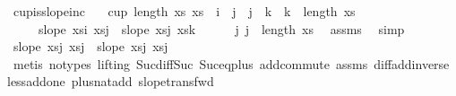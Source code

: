 \begin{isabellebody}
\isamarkupfalse%
\ cup{\isacharunderscore}{\kern0pt}is{\isacharunderscore}{\kern0pt}slopeinc{\isacharcolon}{\kern0pt}\isanewline
\ \ \ {\isachardoublequoteopen}cup\ {\isacharparenleft}{\kern0pt}length\ xs{\isacharparenright}{\kern0pt}\ xs{\isachardoublequoteclose}\ \ {\isachardoublequoteopen}i\ {\isacharless}{\kern0pt}\ j\ {\isasymand}\ j\ {\isacharless}{\kern0pt}\ k\ {\isasymand}\ k\ {\isacharless}{\kern0pt}\ length\ xs{\isachardoublequoteclose}\isanewline
\ \ \ \ \ {\isachardoublequoteopen}slope\ {\isacharparenleft}{\kern0pt}xs{\isacharbang}{\kern0pt}i{\isacharparenright}{\kern0pt}\ {\isacharparenleft}{\kern0pt}xs{\isacharbang}{\kern0pt}j{\isacharparenright}{\kern0pt}\ {\isacharless}{\kern0pt}\ slope\ {\isacharparenleft}{\kern0pt}xs{\isacharbang}{\kern0pt}j{\isacharparenright}{\kern0pt}\ {\isacharparenleft}{\kern0pt}xs{\isacharbang}{\kern0pt}k{\isacharparenright}{\kern0pt}{\isachardoublequoteclose}\isanewline
%
\isadelimproof
%
\endisadelimproof
%
\isatagproof
{}\isamarkupfalse%
{\isacharminus}{\kern0pt}\isanewline
\ \ \isamarkupfalse%
\ {}{\isacharcolon}{\kern0pt}{\isachardoublequoteopen}{}\ {\isacharless}{\kern0pt}\ j{\isachardoublequoteclose}\ {\isachardoublequoteopen}j{\isacharplus}{\kern0pt}{}\ {\isacharless}{\kern0pt}\ length\ xs{\isachardoublequoteclose}\ \isamarkupfalse%
\ assms{\isacharparenleft}{\kern0pt}{}{\isacharparenright}{\kern0pt}\ \isamarkupfalse%
\ simp{\isacharplus}{\kern0pt}\isanewline
\ \ \isamarkupfalse%
\ {}{\isacharcolon}{\kern0pt}{\isachardoublequoteopen}slope\ {\isacharparenleft}{\kern0pt}xs{\isacharbang}{\kern0pt}{\isacharparenleft}{\kern0pt}j{\isacharminus}{\kern0pt}{}{\isacharparenright}{\kern0pt}{\isacharparenright}{\kern0pt}\ {\isacharparenleft}{\kern0pt}xs{\isacharbang}{\kern0pt}j{\isacharparenright}{\kern0pt}\ {\isacharless}{\kern0pt}\ slope\ {\isacharparenleft}{\kern0pt}xs{\isacharbang}{\kern0pt}j{\isacharparenright}{\kern0pt}\ {\isacharparenleft}{\kern0pt}xs{\isacharbang}{\kern0pt}{\isacharparenleft}{\kern0pt}j{\isacharplus}{\kern0pt}{}{\isacharparenright}{\kern0pt}{\isacharparenright}{\kern0pt}{\isachardoublequoteclose}\isanewline
\ \ \ \ \isamarkupfalse%
\ {\isacharparenleft}{\kern0pt}metis\ {\isacharparenleft}{\kern0pt}no{\isacharunderscore}{\kern0pt}types{\isacharcomma}{\kern0pt}\ lifting{\isacharparenright}{\kern0pt}\ Suc{\isacharunderscore}{\kern0pt}diff{\isacharunderscore}{\kern0pt}Suc\ Suc{\isacharunderscore}{\kern0pt}eq{\isacharunderscore}{\kern0pt}plus{}\ add{\isachardot}{\kern0pt}commute\ assms{\isacharparenleft}{\kern0pt}{}{\isacharparenright}{\kern0pt}\ diff{\isacharunderscore}{\kern0pt}add{\isacharunderscore}{\kern0pt}inverse\ less{\isacharunderscore}{\kern0pt}add{\isacharunderscore}{\kern0pt}one\ plus{\isacharunderscore}{\kern0pt}nat{\isachardot}{\kern0pt}add{\isacharunderscore}{\kern0pt}{}\ slope{\isacharunderscore}{\kern0pt}trans{\isacharunderscore}{\kern0pt}fwd{\isacharparenright}{\kern0pt}\isanewline

\end{isabellebody}
